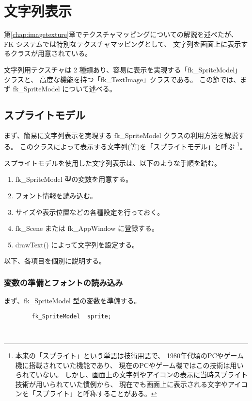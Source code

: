 \chapter{文字列表示} \label{chap:stringimage}
第\ref{chap:imagetexture}章でテクスチャマッピングについての解説を述べたが、
FK システムでは特別なテクスチャマッピングとして、
文字列を画面上に表示するクラスが用意されている。

文字列用テクスチャは 2 種類あり、容易に表示を実現する「fk\_SpriteModel」クラスと、
高度な機能を持つ「fk\_TextImage」クラスである。
この節では、まず fk\_SpriteModel について述べる。

\section{スプライトモデル}
まず、簡易に文字列表示を実現する fk\_SpriteModel クラスの利用方法を解説する。
このクラスによって表示する文字列(等)を「スプライトモデル」と呼ぶ
\footnote{本来の「スプライト」という単語は技術用語で、
1980年代頃のPCやゲーム機に搭載されていた機能であり、
現在のPCやゲーム機ではこの技術は用いられていない。
しかし、画面上の文字列やアイコンの表示に当時スプライト技術が用いられていた慣例から、
現在でも画面上に表示される文字やアイコンを「スプライト」と呼称することがある。}。

スプライトモデルを使用した文字列表示は、以下のような手順を踏む。
\begin{enumerate}
 \item fk\_SpriteModel 型の変数を用意する。
 \item フォント情報を読み込む。
 \item サイズや表示位置などの各種設定を行っておく。
 \item fk\_Scene または fk\_AppWindow に登録する。
 \item drawText() によって文字列を設定する。
\end{enumerate}

以下、各項目を個別に説明する。

\subsection{変数の準備とフォントの読み込み} \label{subsec:initFont}
まず、fk\_SpriteModel 型の変数を準備する。
\\
\begin{screen}
\begin{verbatim}
        fk_SpriteModel  sprite;
\end{verbatim}
\end{screen}
~

